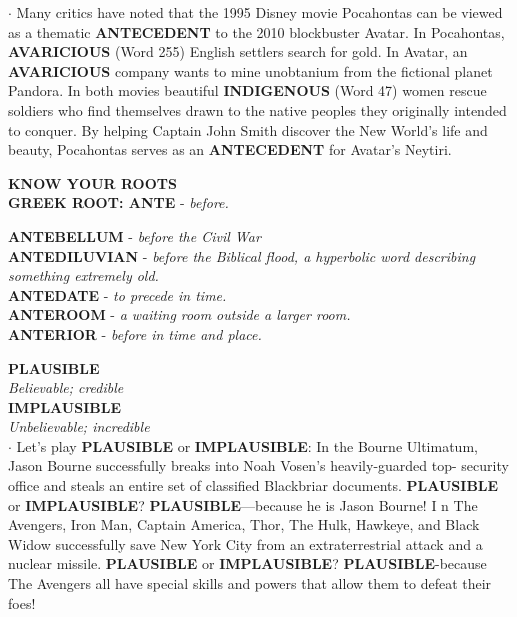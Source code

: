 \documentclass{exam}
\begin{document}
\begin{questions}
$\cdot$ Many critics have noted that the 1995 Disney movie Pocahontas can be viewed as a thematic \textbf{ANTECEDENT} to the 2010 blockbuster Avatar.  In Pocahontas, \textbf{AVARICIOUS} (Word 255) English settlers search for gold. In Avatar, an \textbf{AVARICIOUS} company wants to mine unobtanium from the fictional planet Pandora. In both movies beautiful \textbf{INDIGENOUS} (Word 47) women rescue soldiers who find themselves drawn to the native peoples they originally intended to conquer. By helping Captain John Smith discover the New World's life and beauty, Pocahontas serves as an \textbf{ANTECEDENT} for Avatar’s Neytiri.

\begin{tcolorbox}
\begin{center}
\textbf{ KNOW YOUR ROOTS}\\
\textbf{GREEK ROOT: ANTE }- \textit{before.}\\ 
\end{center}  
 
\textbf{ANTEBELLUM} - \textit{before the Civil War}\\ \textbf{ANTEDILUVIAN} - \textit{before the Biblical flood, a hyperbolic word describing something extremely old.}\\ \textbf{ANTEDATE} - \textit{to precede in time.}\\
\textbf{ANTEROOM} - \textit{a waiting room outside a larger room.}\\ 
\textbf{ANTERIOR} - \textit{before in time and place.}
\end{tcolorbox}

\question \textbf{PLAUSIBLE}\\ \textit{Believable; credible}\\ 
\textbf{IMPLAUSIBLE}\\
\textit{Unbelievable; incredible}\\ 

$\cdot$ Let's play \textbf{PLAUSIBLE} or \textbf{IMPLAUSIBLE}: In the Bourne Ultimatum, Jason Bourne successfully breaks into Noah Vosen's heavily-guarded top- security office and steals an entire set of classified Blackbriar documents. \textbf{PLAUSIBLE} or \textbf{IMPLAUSIBLE}? \textbf{PLAUSIBLE}—because he is Jason Bourne! I n The Avengers, Iron Man, Captain America, Thor, The Hulk, Hawkeye, and Black Widow successfully save New York City from an extraterrestrial attack and a nuclear missile. \textbf{PLAUSIBLE} or \textbf{IMPLAUSIBLE}? \textbf{PLAUSIBLE}-because The Avengers all have special skills and powers that allow them to defeat their foes!


\end{questions}
\end{document}
